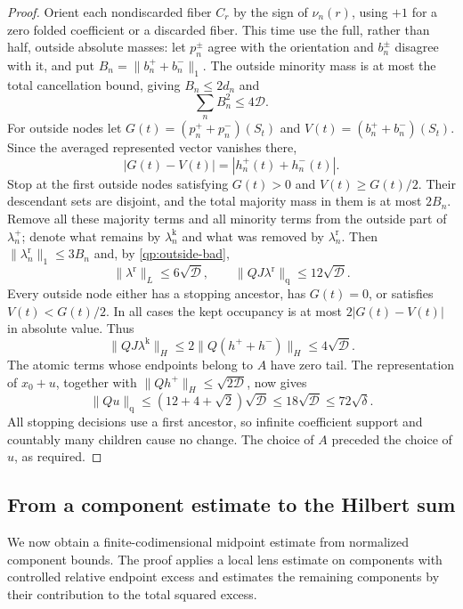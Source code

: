 \begin{proof}
Orient each nondiscarded fiber $C_r$ by the sign of $\nu_n(r)$, using
$+1$ for a zero folded coefficient or a discarded fiber.  This
time use the full, rather than
half, outside absolute masses: let $p_n^\pm$ agree with the
orientation and $b_n^\pm$ disagree with it, and put
$B_n=\|b_n^++b_n^-\|_1$.
The outside minority mass is at most the total cancellation
bound, giving $B_n\le2d_n$ and
\begin{equation}\label{qp:outside-bad}
 \sum_nB_n^2\le4\mathcal D.
\end{equation}
For outside nodes let
$G(t)=(p_n^++p_n^-)(S_t)$ and
$V(t)=(b_n^++b_n^-)(S_t)$.
Since the averaged represented vector vanishes there,
\[
 |G(t)-V(t)|=|h_n^+(t)+h_n^-(t)|.
\]
Stop at the first outside nodes satisfying $G(t)>0$ and
$V(t)\ge G(t)/2$.  Their descendant sets are disjoint, and
the total majority mass in them is at most $2B_n$.
Remove all these majority terms and all minority terms from the
outside part of $\lambda_n^+$; denote what remains by
$\lambda_n^{\mathrm k}$ and what was removed by
$\lambda_n^{\mathrm r}$.  Then
$\|\lambda_n^{\mathrm r}\|_1\le3B_n$ and, by
\eqref{qp:outside-bad},
\[
 \|\lambda^{\mathrm r}\|_L\le6\sqrt{\mathcal D},
 \qquad \|QJ\lambda^{\mathrm r}\|_{\mathrm q}\le12\sqrt{\mathcal D}.
\]
Every outside node either has a stopping ancestor, has $G(t)=0$,
or satisfies $V(t)<G(t)/2$.  In all cases the kept occupancy is
at most $2|G(t)-V(t)|$ in absolute value.  Thus
\[
 \|QJ\lambda^{\mathrm k}\|_H
 \le2\|Q(h^++h^-)\|_H\le4\sqrt{\mathcal D}.
\]
The atomic terms whose endpoints belong to $A$ have zero tail.
The representation of $x_0+u$, together with
$\|Qh^+\|_H\le\sqrt{2\mathcal D}$, now gives
\[
 \|Qu\|_{\mathrm q}\le(12+4+\sqrt2)\sqrt{\mathcal D}
 \le18\sqrt{\mathcal D}\le72\sqrt\delta.
\]
All stopping decisions use a first ancestor, so infinite
coefficient support and countably many children cause no change.
The choice of $A$ preceded the choice of $u$, as required.
\end{proof}

\subsection{From a component estimate to the Hilbert sum}
\label{qp:rec:section}

We now obtain a finite-codimensional midpoint estimate from normalized
component bounds. The proof applies a local lens estimate on components
with controlled relative endpoint excess and estimates the remaining
components by their contribution to the total squared excess.

